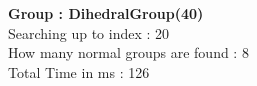 \textbf{Group : DihedralGroup(40)}\\
Searching up to index : 20\\
How many normal groups are found : 8\\
Total Time in ms : 126\\
